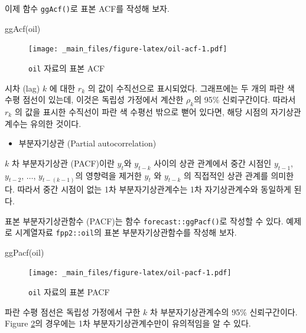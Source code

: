 \documentclass[
]{book}
\newenvironment{Shaded}{\begin{snugshade}}{\end{snugshade}}
\newcommand{\FunctionTok}[1]{\textcolor[rgb]{0.00,0.00,0.00}{#1}}
\newcommand{\NormalTok}[1]{#1}
\providecommand{\tightlist}{%
  \setlength{\itemsep}{0pt}\setlength{\parskip}{0pt}}
\begin{document}
이제 함수 \texttt{ggAcf()}로 표본 ACF를 작성해 보자.

\begin{Shaded}
\begin{Highlighting}[]
\FunctionTok{ggAcf}\NormalTok{(oil)}
\end{Highlighting}
\end{Shaded}

\begin{figure}
\centering
\texttt{[image: \_main\_files/figure-latex/oil-acf-1.pdf]}
\caption{\label{fig:oil-acf}\texttt{oil} 자료의 표본 ACF}
\end{figure}

시차 (lag) \(k\) 에 대한 \(r_{k}\) 의 값이 수직선으로 표시되었다.
그래프에는 두 개의 파란 색 수평 점선이 있는데, 이것은 독립성 가정에서 계산한 \(\rho_{k}\)의 95\% 신뢰구간이다.
따라서 \(r_{k}\) 의 값을 표시한 수직선이 파란 색 수평선 밖으로 뻗어 있다면, 해당 시점의 자기상관계수는 유의한 것이다.

\begin{itemize}
\tightlist
\item
  부분자기상관 (Partial autocorrelation)
\end{itemize}

\(k\) 차 부분자기상관 (PACF)이란 \(y_{t}\)와 \(y_{t-k}\) 사이의 상관 관계에서 중간 시점인 \(y_{t-1}\), \(y_{t-2}\), \(\ldots\), \(y_{t-(k-1)}\)의 영향력을 제거한 \(y_{t}\) 와 \(y_{t-k}\) 의 직접적인 상관 관계를 의미한다.
따라서 중간 시점이 없는 1차 부분자기상관계수는 1차 자기상관계수와 동일하게 된다.

표본 부분자기상관함수 (PACF)는 함수 \texttt{forecast::ggPacf()}로 작성할 수 있다.
예제로 시계열자료 \texttt{fpp2::oil}의 표본 부분자기상관함수를 작성해 보자.

\begin{Shaded}
\begin{Highlighting}[]
\FunctionTok{ggPacf}\NormalTok{(oil)}
\end{Highlighting}
\end{Shaded}

\begin{figure}
\centering
\texttt{[image: \_main\_files/figure-latex/oil-pacf-1.pdf]}
\caption{\label{fig:oil-pacf}\texttt{oil} 자료의 표본 PACF}
\end{figure}

파란 수평 점선은 독립성 가정에서 구한 \(k\) 차 부분자기상관계수의 95\% 신뢰구간이다.
Figure \ref{fig:oil-pacf}의 경우에는 1차 부분자기상관계수만이 유의적임을 알 수 있다.
\end{document}
